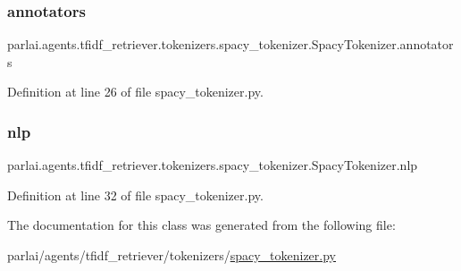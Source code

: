 \subsubsection{\texorpdfstring{annotators}{annotators}}
{\footnotesize\ttfamily parlai.\+agents.\+tfidf\+\_\+retriever.\+tokenizers.\+spacy\+\_\+tokenizer.\+Spacy\+Tokenizer.\+annotators}



Definition at line 26 of file spacy\+\_\+tokenizer.\+py.

\mbox{\label{classparlai_1_1agents_1_1tfidf__retriever_1_1tokenizers_1_1spacy__tokenizer_1_1SpacyTokenizer_a7124470b153c9ed25f1c7a1404dd8e1d}} 
\subsubsection{\texorpdfstring{nlp}{nlp}}
{\footnotesize\ttfamily parlai.\+agents.\+tfidf\+\_\+retriever.\+tokenizers.\+spacy\+\_\+tokenizer.\+Spacy\+Tokenizer.\+nlp}



Definition at line 32 of file spacy\+\_\+tokenizer.\+py.



The documentation for this class was generated from the following file\+:\begin{DoxyCompactItemize}
\item 
parlai/agents/tfidf\+\_\+retriever/tokenizers/\hyperlink{spacy__tokenizer_8py}{spacy\+\_\+tokenizer.\+py}\end{DoxyCompactItemize}
